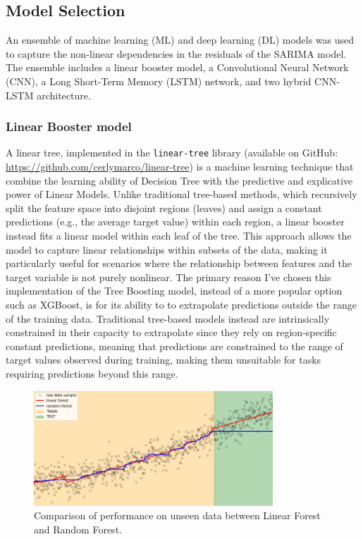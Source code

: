 \subsection{Model Selection}
An ensemble of machine learning (ML) and deep learning (DL) models was used to capture the non-linear dependencies in the residuals of the SARIMA model. The ensemble includes a linear booster model, a Convolutional Neural Network (CNN), a Long Short-Term Memory (LSTM) network, and two hybrid CNN-LSTM architecture. 

\subsubsection{Linear Booster model}

A linear tree, implemented in the \texttt{linear-tree} library (available on GitHub: \url{https://github.com/cerlymarco/linear-tree}) is a machine learning technique that combine the learning ability of Decision Tree with the predictive and explicative power of Linear Models. Unlike traditional tree-based methods, which recursively split the feature space into disjoint regions (leaves) and assign a constant predictions (e.g., the average target value) within each region, a linear booster instead fits a linear model within each leaf of the tree. This approach allows the model to capture linear relationships within subsets of the data, making it particularly useful for scenarios where the relationship between features and the target variable is not purely nonlinear. The primary reason I've chosen this implementation of the Tree Boosting model, instead of a more popular option such as XGBoost, is for its ability to to extrapolate predictions outside the range of the training data. Traditional tree-based models instead are intrinsically constrained in their capacity to extrapolate since they rely on region-specific constant predictions, meaning that predictions are constrained to the range of target values observed during training, making them unsuitable for tasks requiring predictions beyond this range.
 \begin{figure}[H]
    \centering
    \includegraphics[width=0.8\textwidth]{Machine_learning_thesis/Images/Linear forest.png}
    \caption{Comparison of performance on unseen data between Linear Forest and Random Forest.} 
    \label{fig:Linear Forest}
\end{figure}

